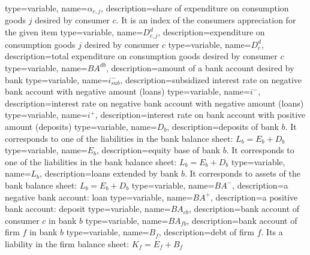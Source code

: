 {%
  type=variable,%
  name={$\alpha_{c,j}$},%
  description={share of expenditure on consumption goods $j$ desired by consumer $c$. It is an index of the consumers appreciation for the given item} 
}
{%
  type=variable,%
  name={$D^{d}_{c,j}$},%
  description={expenditure on consumption goods $j$ desired by consumer $c$} 
}
{%
  type=variable,%
  name={$D^{d}_{c}$},%
  description={total expenditure on consumption goods desired by consumer $c$} 
}
{%
  type=variable,%
  name={$BA^{db}$},%
  description={amount of a bank account desired by bank} 
}
{%
  type=variable,%
  name={$i_{sub}^-$},%
  description={subsidized interest rate on negative bank account with negative amount (loans)} 
}
{%
  type=variable,%
  name={$i^-$},%
  description={interest rate on negative bank account with negative amount (loans)} 
}
{%
  type=variable,%
  name={$i^+$},%
  description={interest rate on bank account with positive amount (deposits)} 
}
{%
  type=variable,%
  name={$D_b$},%
  description={deposits of bank $b$. It corresponds to one of the liabilities in the bank balance sheet: $L_b=E_b+D_b$} 
}
{%
  type=variable,%
  name={$E_b$},%
  description={equity base of bank $b$. It corresponds to one of the liabilities in the bank balance sheet: $L_b=E_b+D_b$} 
}
{%
  type=variable,%
  name={$L_b$},%
  description={loans extended by bank $b$. It corresponds to assets of the bank balance sheet: $L_b=E_b+D_b$} 
}
{%
  type=variable,%
  name={$BA^-$},%
  description={a negative bank account: loan} 
}
{%
  type=variable,%
  name={$BA^+$},%
  description={a positive bank account: deposit} 
}
{%
  type=variable,%
  name={$BA_{cb}$},%
  description={bank account of consumer $c$ in bank $b$} 
}
{%
  type=variable,%
  name={$BA_{fb}$},%
  description={bank account of firm $f$ in bank $b$} 
}
{%
  type=variable,%
  name={$B_{f}$},%
  description={debt of firm $f$. Its a liability in the firm balance sheet: $K_f=E_f+B_f$} 
}
